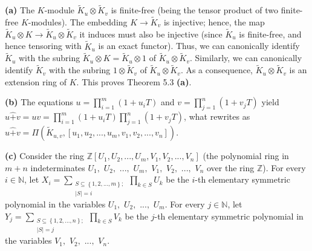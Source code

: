 \documentclass[numbers=enddot,12pt,final,onecolumn,notitlepage]{scrartcl}%
\begin{document}
\textbf{(a)} The $K$-module $\widetilde{K}_{u}\otimes\widetilde{K}_{v}$ is
finite-free (being the tensor product of two finite-free $K$-modules). The
embedding $K\rightarrow\widetilde{K}_{v}$ is injective; hence, the map
$\widetilde{K}_{u}\otimes K\rightarrow\widetilde{K}_{u}\otimes\widetilde{K}%
_{v}$ it induces must also be injective (since $\widetilde{K}_{u}$ is
finite-free, and hence tensoring with $\widetilde{K}_{u}$ is an exact
functor). Thus, we can canonically identify $\widetilde{K}_{u}$ with the
subring $\widetilde{K}_{u}\otimes K=\widetilde{K}_{u}\otimes1$ of
$\widetilde{K}_{u}\otimes\widetilde{K}_{v}$. Similarly, we can canonically
identify $\widetilde{K}_{v}$ with the subring $1\otimes\widetilde{K}_{v}$ of
$\widetilde{K}_{u}\otimes\widetilde{K}_{v}$. As a consequence, $\widetilde{K}%
_{u}\otimes\widetilde{K}_{v}$ is an extension ring of $K$. This proves Theorem
5.3 \textbf{(a)}.

\textbf{(b)} The equations $u=\prod\limits_{i=1}^{m}\left(  1+u_{i}T\right)  $
and $v=\prod\limits_{j=1}^{n}\left(  1+v_{j}T\right)  $ yield $u\widehat{+}%
v=uv=\prod\limits_{i=1}^{m}\left(  1+u_{i}T\right)  \prod\limits_{j=1}%
^{n}\left(  1+v_{j}T\right)  $, what rewrites as $u\widehat{+}v=\Pi\left(
\widetilde{K}_{u,v},\left[  u_{1},u_{2},...,u_{m},v_{1},v_{2},...,v_{n}%
\right]  \right)  .$

\textbf{(c)} Consider the ring $\mathbb{Z}\left[  U_{1},U_{2},...,U_{m}%
,V_{1},V_{2},...,V_{n}\right]  $ (the polynomial ring in $m+n$ indeterminates
$U_{1},$ $U_{2},$ $...,$ $U_{m},$ $V_{1},$ $V_{2},$ $...,$ $V_{n}$ over the
ring $\mathbb{Z}$). For every $i\in\mathbb{N}$, let $X_{i}=\sum
\limits_{\substack{S\subseteq\left\{  1,2,...,m\right\}  ;\\\left\vert
S\right\vert =i}}\prod\limits_{k\in S}U_{k}$ be the $i$-th elementary
symmetric polynomial in the variables $U_{1},$ $U_{2},$ $...,$ $U_{m}$. For
every $j\in\mathbb{N}$, let $Y_{j}=\sum\limits_{\substack{S\subseteq\left\{
1,2,...,n\right\}  ;\\\left\vert S\right\vert =j}}\prod\limits_{k\in S}V_{k}$
be the $j$-th elementary symmetric polynomial in the variables $V_{1},$
$V_{2},$ $...,$ $V_{n}$.
\end{document}

